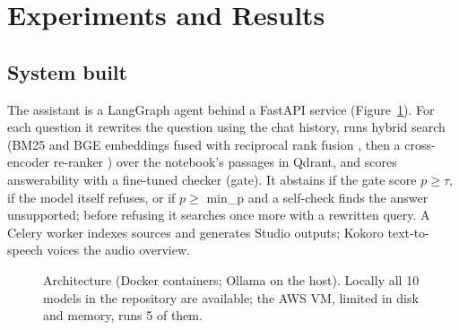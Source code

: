 \documentclass[10pt]{article}
\begin{document}
\section{Experiments and Results}
\subsection{System built}
The assistant is a LangGraph agent behind a FastAPI service (Figure~\ref{fig:arch}). For each question it rewrites the question using the chat history, runs hybrid search (BM25 \cite{bm25} and BGE embeddings \cite{bge} fused with reciprocal rank fusion \cite{rrf}, then a cross-encoder re-ranker \cite{monobert}) over the notebook's passages in Qdrant, and scores answerability with a fine-tuned checker (gate). It abstains if the gate score $p\ge\tau$, if the model itself refuses, or if $p\ge$ min\_p and a self-check finds the answer unsupported; before refusing it searches once more with a rewritten query. A Celery worker indexes sources and generates Studio outputs; Kokoro text-to-speech voices the audio overview.

\begin{figure}[H]
\centering
{}
\caption{Architecture (Docker containers; Ollama on the host). Locally all 10 models in the repository are available; the AWS VM, limited in disk and memory, runs 5 of them.}
\label{fig:arch}
\end{figure}
\vspace{-6pt}
\end{document}
